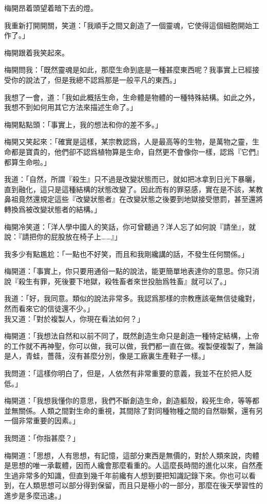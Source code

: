梅開昂着頭望着暗下去的燈。

我重新打開開關，笑道：「我順手之間又創造了一個靈魂，它使得這個細胞開始工作了。」

梅開跟着我笑起來。

梅開問我：「既然靈魂是如此，那麼生命到底是一種甚麼東西呢？我事實上已經接受你的說法了，但是我總不認爲那是一般平凡的東西。」

我想了一會，道：「我如此概括生命，生命體是物體的一種特殊結構。如此之外，我想不到如何用其它方法來描述生命了。」

梅開點點頭：「事實上，我的想法和你的差不多。」

梅開又笑起來：「確實是這樣，某宗教認爲，人是最高等的生物，是萬物之靈，生命都是寶貴的，他們卻不認爲植物算是生命，自然更不會像你一樣，認爲『它們』都算生命啦。」

我道：「自然，所謂『殺生』只不過是改變狀態而已，就如把冰拿到日光下暴曬，直到融化，這只是這種結構的狀態改變了。因此而有的罪惡感，實在是不該，某教鼻祖竟然還規定這些『改變狀態者』在改變狀態之後要到地獄接受懲罰，甚至還將轉換爲被改變狀態者的結構。」

梅開冷笑道：「洋人學中國人的笑話，你可曾聽過？洋人忘了如何說『請坐』，就說：『請把你的屁股放在椅子上……』」

我多少有點尷尬：「一點也不好笑，而且和我剛纔講的話，不發生任何關係。」


梅開道：「事實上，你只要用通俗一點的說法，能更簡單地表達你的意思。你只消說『殺生有罪，死後要下地獄，殺牲畜者來世投胎爲牲畜』就可以了。」

我道：「好，我同意。類似的說法非常多。我認爲那樣的宗教應該毫無信徒纔對，然而看來它的信徒還不少。」
\\


我又道：「對於複製人，你現在看法如何？」

梅開道：「我想法自然和以前不同了，既然創造生命只是創造一種特定結構，上帝的工作就不再神聖，你可以做，我可以做，我們都一直在做。複製便複製了，無論是人，青蛙，薔薇，沒有甚麼分別，像是工廠裏生產鞋子一樣。」

我問道：「這樣你明白了，但是，人依然有非常重要的意義，我並不在於把人貶低。」

梅開道：「我想我懂你的意思，我們不斷創造生命，創造軀殼，殺死生命，等等都並無關係。人類之間對生命的重視，其間除了對同種物種之間的自然聯繫，還有另一個非常重要的因素。」

我問道：「你指甚麼？」

梅開道：「思想，人有思想，有記憶，這部分東西是無價的，對於人類來說，肉體是思想的唯一承載體，因而人纔會那麼看重的。人這麼長時間的進化以來，自然產生過非常多的知識，但直到幾千年前纔有人想到要把知識記錄下來。你也可以看到，在人類思想可以部分得到保留，而且只是極小的一部分，那麼在後天學習性的進步是多麼迅速。」

